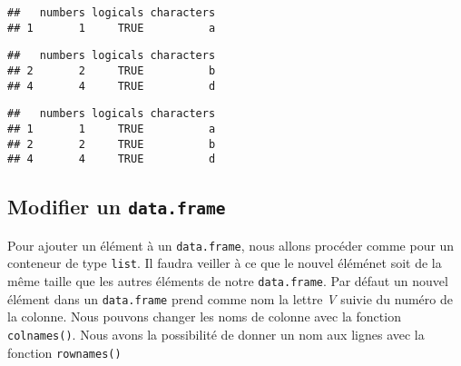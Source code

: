 \documentclass[]{book}
\newenvironment{Shaded}{\begin{snugshade}}{\end{snugshade}}
\newcommand{\KeywordTok}[1]{\textcolor[rgb]{0.13,0.29,0.53}{\textbf{#1}}}
\newcommand{\DecValTok}[1]{\textcolor[rgb]{0.00,0.00,0.81}{#1}}
\newcommand{\StringTok}[1]{\textcolor[rgb]{0.31,0.60,0.02}{#1}}
\newcommand{\OtherTok}[1]{\textcolor[rgb]{0.56,0.35,0.01}{#1}}
\newcommand{\OperatorTok}[1]{\textcolor[rgb]{0.81,0.36,0.00}{\textbf{#1}}}
\newcommand{\NormalTok}[1]{#1}
\theoremstyle{definition}
\theoremstyle{definition}
\theoremstyle{definition}
\theoremstyle{remark}
\begin{document}
\begin{verbatim}
##   numbers logicals characters
## 1       1     TRUE          a
\end{verbatim}

\begin{Shaded}
\end{Shaded}

\begin{verbatim}
##   numbers logicals characters
## 2       2     TRUE          b
## 4       4     TRUE          d
\end{verbatim}

\begin{Shaded}
\end{Shaded}

\begin{verbatim}
##   numbers logicals characters
## 1       1     TRUE          a
## 2       2     TRUE          b
## 4       4     TRUE          d
\end{verbatim}

\subsection{\texorpdfstring{Modifier un
\texttt{data.frame}}{Modifier un data.frame}}\label{modifier-un-data.frame}

Pour ajouter un élément à un \texttt{data.frame}, nous allons procéder
comme pour un conteneur de type \texttt{list}. Il faudra veiller à ce
que le nouvel éléménet soit de la même taille que les autres éléments de
notre \texttt{data.frame}. Par défaut un nouvel élément dans un
\texttt{data.frame} prend comme nom la lettre \emph{V} suivie du numéro
de la colonne. Nous pouvons changer les noms de colonne avec la fonction
\texttt{colnames()}. Nous avons la possibilité de donner un nom aux
lignes avec la fonction \texttt{rownames()}
\end{document}
